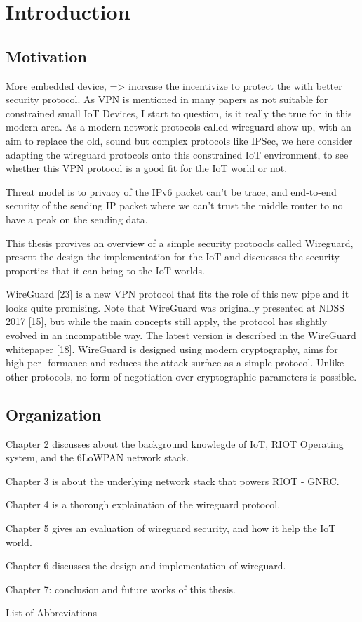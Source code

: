 \chapter{Introduction}
\section{Motivation}

  More embedded device, => increase the incentivize to protect the with better security protocol.
  As VPN is mentioned in many papers as not suitable for constrained small IoT Devices, 
  I start to question, is it really the true for in this modern area. 
  As a modern network protocols called wireguard show up, with an aim to replace
  the old, sound but complex protocols like IPSec, we here consider adapting the wireguard
  protocols onto this constrained IoT environment, to see whether this VPN protocol is 
  a good fit for the IoT world or not.

  Threat model is to privacy of the IPv6 packet can't be trace, and end-to-end security 
  of the sending IP packet where we can't trust the middle router to no have a peak
  on the sending data.

  This thesis provives an overview of a simple security protoocls called Wireguard, 
  present the design the implementation for the IoT and discuesses the security
  properties that it can bring to the IoT worlds.

  WireGuard [23] is a new VPN protocol that fits the role of this new pipe
and it looks quite promising. Note that WireGuard was originally presented
at NDSS 2017 [15], but while the main concepts still apply, the protocol has
slightly evolved in an incompatible way. The latest version is described in
the WireGuard whitepaper [18].
WireGuard is designed using modern cryptography, aims for high per-
formance and reduces the attack surface as a simple protocol. Unlike other
protocols, no form of negotiation over cryptographic parameters is possible.
\section{Organization}

  Chapter 2 discusses about the background knowlegde of IoT, RIOT Operating system, and the
  6LoWPAN network stack.

  Chapter 3 is about the underlying network stack that powers RIOT - GNRC.

  Chapter 4 is a thorough explaination of the wireguard protocol.

  Chapter 5 gives an evaluation of wireguard security, and how it help
  the IoT world.

  Chapter 6 discusses the design and implementation of wireguard.


  Chapter 7: conclusion and future works of this thesis.

List of Abbreviations
